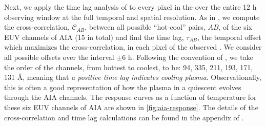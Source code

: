 Next, we apply the time lag analysis of \citet{viall_evidence_2012} to every pixel in the \AR{} over the entire 12 h observing window at the full temporal and spatial resolution.
As in , we compute the cross-correlation, $\mathcal{C}_{AB}$, between all possible ``hot-cool'' pairs, $AB$, of the six EUV channels of AIA (15 in total) and find the time lag, $\tau_{AB}$, the temporal offset which maximizes the cross-correlation, in each pixel of the observed \AR{}.
We consider all possible offsets over the interval $\pm6$ h.
Following the convention of \citet{viall_evidence_2012}, we take the order of the channels, from hottest to coolest, to be: 94, 335, 211, 193, 171, 131 \AA{}, meaning that \textit{a positive time lag indicates cooling plasma}.
Observationally, this is often a good representation of how the plasma in a quiescent \AR{} evolves through the AIA channels.
The response curves as a function of temperature for these six EUV channels of AIA are shown in \autoref{fig:aia-response}.
The details of the cross-correlation and time lag calculations can be found in the appendix of .


